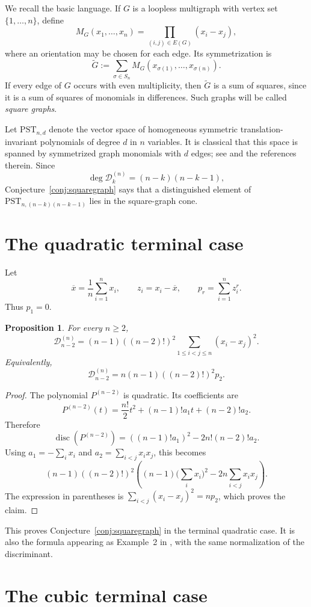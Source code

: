 \documentclass[11pt]{amsart}
\numberwithin{equation}{section}
\newtheorem{proposition}[theorem]{Proposition}
\newcommand{\D}{\mathcal D}
\newcommand{\disc}{\operatorname{disc}}
\newcommand{\barx}{\overline{x}}
\begin{document}
We recall the basic language.  If $G$ is a loopless multigraph with vertex set
$\{1,\ldots,n\}$, define
\[
M_G(x_1,\ldots,x_n)=\prod_{(i,j)\in E(G)}(x_i-x_j),
\]
where an orientation may be chosen for each edge.  Its symmetrization is
\[
\widetilde G:=\sum_{\sigma\in S_n}M_G(x_{\sigma(1)},\ldots,x_{\sigma(n)}).
\]
If every edge of $G$ occurs with even multiplicity, then $\widetilde G$ is a
sum of squares, since it is a sum of squares of monomials in differences.
Such graphs will be called \emph{square graphs}.

Let $\mathrm{PST}_{n,d}$ denote the vector space of homogeneous symmetric
translation-invariant polynomials of degree $d$ in $n$ variables.  It is
classical that this space is spanned by symmetrized graph monomials with $d$
edges; see \cite{AS} and the references therein.  Since
\[
\deg \D_k^{(n)}=(n-k)(n-k-1),
\]
Conjecture~\ref{conj:squaregraph} says that a distinguished element of
$\mathrm{PST}_{n,(n-k)(n-k-1)}$ lies in the square-graph cone.

\section{The quadratic terminal case}

Let
\[
\barx=\frac1n\sum_{i=1}^n x_i,
\qquad
z_i=x_i-\barx,
\qquad
p_r=\sum_{i=1}^n z_i^r .
\]
Thus $p_1=0$.

\begin{proposition}\label{prop:quadratic}
For every $n\ge2$,
\[
\D_{n-2}^{(n)}
=(n-1)((n-2)!)^2\sum_{1\le i<j\le n}(x_i-x_j)^2.
\]
Equivalently,
\[
\D_{n-2}^{(n)}=n(n-1)((n-2)!)^2p_2.
\]
\end{proposition}

\begin{proof}
The polynomial $P^{(n-2)}$ is quadratic.  Its coefficients are
\[
P^{(n-2)}(t)=\frac{n!}{2}t^2+(n-1)!a_1t+(n-2)!a_2.
\]
Therefore
\[
\disc(P^{(n-2)})=((n-1)!a_1)^2-2n!(n-2)!a_2.
\]
Using $a_1=-\sum_i x_i$ and $a_2=\sum_{i<j}x_ix_j$, this becomes
\[
(n-1)((n-2)!)^2\left((n-1)\Big(\sum_i x_i\Big)^2
-2n\sum_{i<j}x_ix_j\right).
\]
The expression in parentheses is
$\sum_{i<j}(x_i-x_j)^2=np_2$, which proves the claim.
\end{proof}

This proves Conjecture~\ref{conj:squaregraph} in the terminal quadratic case.
It is also the formula appearing as Example~2 in \cite{AS}, with the same
normalization of the discriminant.

\section{The cubic terminal case}
\end{document}
